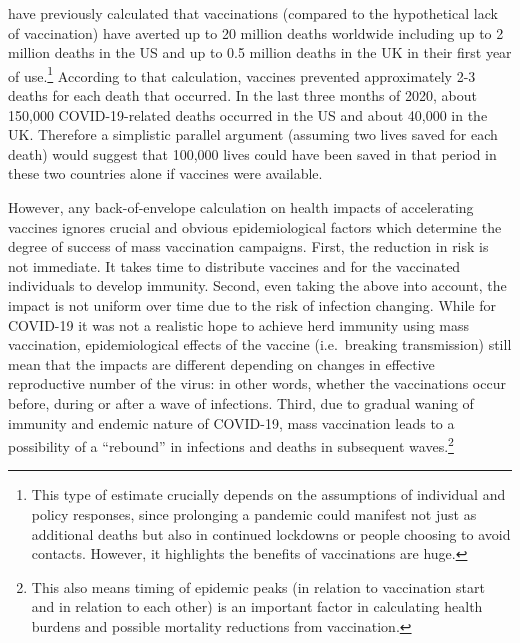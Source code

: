 \documentclass{article}
\begin{document}
\citet{watsonGlobalImpactFirst2022} have previously calculated that vaccinations (compared to the hypothetical lack of vaccination) have averted up to 20 million deaths worldwide including up to 2 million deaths in the US and up to 0.5 million deaths in the UK in their first year of use.\footnote{This type of estimate crucially depends on the assumptions of individual and policy responses, since prolonging a pandemic could manifest not just as additional deaths but also in continued lockdowns or people choosing to avoid contacts. However, it highlights the benefits of vaccinations are huge.} According to that calculation, vaccines prevented approximately 2-3 deaths for each death that occurred. In the last three months of 2020, about 150,000 COVID-19-related deaths occurred in the US and about 40,000 in the UK. Therefore a simplistic parallel argument (assuming two lives saved for each death) would suggest that 100,000 lives could have been saved in that period in these two countries alone if vaccines were available.

However, any back-of-envelope calculation on health impacts of accelerating vaccines ignores crucial and obvious epidemiological factors which determine the degree of success of mass vaccination campaigns. First, the reduction in risk is not immediate. It takes time to distribute vaccines and for the vaccinated individuals to develop immunity. Second, even taking the above into account, the impact is not uniform over time due to the risk of infection changing. While for COVID-19 it was not a realistic hope to achieve herd immunity using mass vaccination, epidemiological effects of the vaccine (i.e.~breaking transmission) still mean that the impacts are different depending on changes in effective reproductive number of the virus: in other words, whether the vaccinations occur before, during or after a wave of infections. Third, due to gradual waning of immunity and endemic nature of COVID-19, mass vaccination leads to a possibility of a ``rebound'' in infections and deaths in subsequent waves.\footnote{This also means timing of epidemic peaks (in relation to vaccination start and in relation to each other) is an important factor in calculating health burdens and possible mortality reductions from vaccination.}
\end{document}
